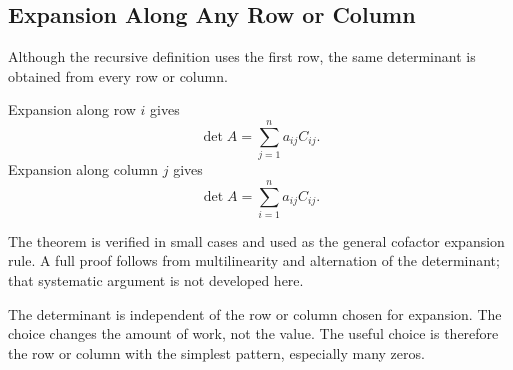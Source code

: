 \subsection{Expansion Along Any Row or Column}

Although the recursive definition uses the first row, the same determinant is obtained from every row or column.

\begin{theorembox}
Expansion along row $i$ gives
\[
\boxed{\det A=\sum_{j=1}^{n}a_{ij}C_{ij}}.
\]
Expansion along column $j$ gives
\[
\boxed{\det A=\sum_{i=1}^{n}a_{ij}C_{ij}}.
\]
\end{theorembox}

\begin{remarkbox}
The theorem is verified in small cases and used as the general cofactor expansion rule. A full proof follows from multilinearity and alternation of the determinant; that systematic argument is not developed here.
\end{remarkbox}

\begin{interpretationbox}
The determinant is independent of the row or column chosen for expansion. The choice changes the amount of work, not the value. The useful choice is therefore the row or column with the simplest pattern, especially many zeros.
\end{interpretationbox}
